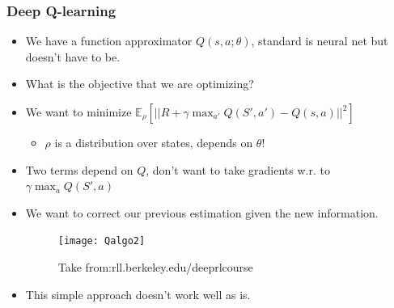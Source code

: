 \documentclass[handout]{beamer}
\begin{document}
\begin{frame}\frametitle{Deep Q-learning}\small

\begin{itemize}
	\item We have a function approximator $Q(s,a;\theta)$, standard is neural net but doesn't have to be.
	\onslide<2->\item What is the objective that we are optimizing?
	\onslide<3->\item  We want to minimize $\mathbb{E}_{\rho}[||R+\gamma\max_{a'} Q(S',a')-Q(s,a)||^2]$
	\begin{itemize}
		\item $\rho$ is a distribution over states, depends on $\theta$!
	\end{itemize}
	\item Two terms depend on $Q$, don't want to take gradients w.r. to $\gamma\max_aQ(S',a)$
	\onslide<5->\item We want to correct our previous estimation given the new information.
			\vspace{-0.2cm}
	\begin{figure}
		\texttt{[image: Qalgo2]}
		\vspace{-0.4cm}
		\caption{Take from:rll.berkeley.edu/deeprlcourse}
	\end{figure}
		\vspace{-0.5cm}
	\item This simple approach doesn't work well as is.
	
	
\end{itemize}
\end{frame}
\end{document}
